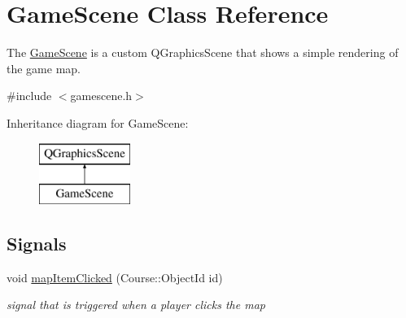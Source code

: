 \hypertarget{classGameScene}{\section{Game\-Scene Class Reference}
\label{classGameScene}
}


The \hyperlink{classGameScene}{Game\-Scene} is a custom Q\-Graphics\-Scene that shows a simple rendering of the game map.  




{\ttfamily \#include $<$gamescene.\-h$>$}

Inheritance diagram for Game\-Scene\-:\begin{figure}[H]
\begin{center}
\leavevmode
\includegraphics[height=2.000000cm]{classGameScene}
\end{center}
\end{figure}
\subsection*{Signals}
\begin{DoxyCompactItemize}
\item 
void \hyperlink{classGameScene_abb07876bec503c4f8e06251c67c92b43}{map\-Item\-Clicked} (Course\-::\-Object\-Id id)
\begin{DoxyCompactList}\small\item\em signal that is triggered when a player clicks the map \end{DoxyCompactList}\end{DoxyCompactItemize}
